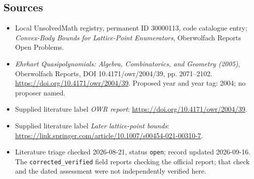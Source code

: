 \documentclass[11pt]{article}
\begin{document}
\subsection{Sources}
\begin{itemize}\item Local UnsolvedMath registry, permanent ID 30000113, code catalogue entry; \emph{Convex-Body Bounds for Lattice-Point Enumerators}, Oberwolfach Reports Open Problems.\item \emph{Ehrhart Quasipolynomials: Algebra, Combinatorics, and Geometry (2005)}, Oberwolfach Reports, DOI 10.4171/owr/2004/39, pp. 2071--2102. \url{https://doi.org/10.4171/owr/2004/39}. Proposed year and year tag: 2004; no proposer named.\item Supplied literature label \emph{OWR report}: \url{https://doi.org/10.4171/owr/2004/39}.\item Supplied literature label \emph{Later lattice-point bounds}: \url{https://link.springer.com/article/10.1007/s00454-021-00310-7}.\item Literature triage checked 2026-08-21, status \texttt{open}; record updated 2026-09-16. The \texttt{corrected\_verified} field reports checking the official report; that check and the dated assessment were not independently verified here.\end{itemize}
\end{document}
